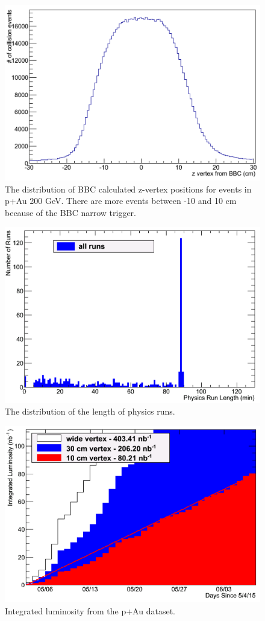 \begin{figure}[h!]
\begin{center}
\includegraphics[width=0.65\linewidth]{figs/bbc_z_vertex_dist.png}
\caption{The distribution of BBC calculated z-vertex positions for events in p+Au 200 GeV. There are more events between -10 and 10 cm because of the BBC narrow trigger.}\label{fig:bbc_z_vtx_dist}

\end{center}
\end{figure}

\begin{figure}[!h]
\begin{center}
\includegraphics[width=0.65\linewidth]{figs/hruntime.png}
\caption{The distribution of the length of physics runs.}
\end{center}
\end{figure}

\begin{figure}[!h]
\begin{center}
\includegraphics[width=0.65\linewidth]{figs/integrated_luminosity.png}
\caption{Integrated luminosity from the p+Au dataset.}
\end{center}
\end{figure}
